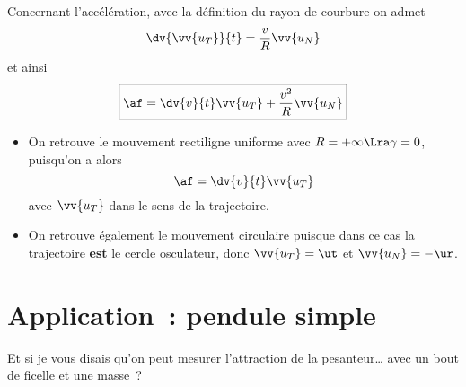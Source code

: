 \documentclass[../main/main.tex]{subfiles}
\begin{document}
Concernant l'accélération, avec la définition du rayon de courbure on admet
\[ \dv{\vv{u_T}}{t} = \frac{v}{R}\vv{u_N}\]
et ainsi
\[
    \boxed{\af = \dv{v}{t}\vv{u_T} + \frac{v^2}{R}\vv{u_N}}
\]

\begin{itemize}
    \item On retrouve le mouvement rectiligne uniforme avec $R = +\infty \Lra
        \gamma = 0$, puisqu'on a alors
        \[\af = \dv{v}{t}\vv{u_T}\]
        avec $\vv{u_T}$ dans le sens de la trajectoire.

    \item On retrouve également le mouvement circulaire puisque dans ce cas la
        trajectoire \textbf{est} le cercle osculateur, donc $\vv{u_T} = \ut$ et
        $\vv{u_N} = -\ur$.
\end{itemize}

\section{Application~: pendule simple}

Et si je vous disais qu'on peut mesurer l'attraction de la pesanteur… avec un
bout de ficelle et une masse~? \bigbreak
\end{document}
